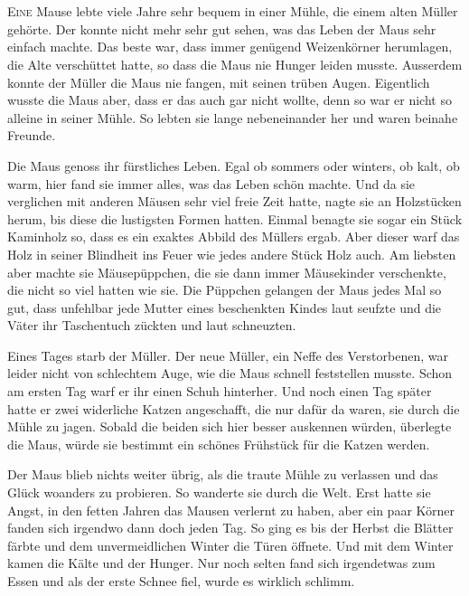 \chapter*{}
\lettrine[lines=3]{\color{red}E}{ine} Mause lebte viele Jahre sehr bequem in einer Mühle, die einem alten Müller gehörte. Der konnte nicht mehr sehr gut sehen, was das Leben der Maus sehr einfach machte. Das beste war, dass immer genügend Weizenkörner herumlagen, die Alte verschüttet hatte, so dass die Maus nie Hunger leiden musste. Ausserdem konnte der Müller die Maus nie fangen, mit seinen trüben Augen. Eigentlich wusste die Maus aber, dass er das auch gar nicht wollte, denn so war er nicht so alleine in seiner Mühle. So lebten sie lange nebeneinander her und waren beinahe Freunde. 

Die Maus genoss ihr fürstliches Leben. Egal ob sommers oder winters, ob kalt, ob warm, hier fand sie immer alles, was das Leben schön machte. Und da sie verglichen mit anderen Mäusen sehr viel freie Zeit hatte, nagte sie an Holzstücken herum, bis diese die lustigsten Formen hatten. Einmal benagte sie sogar ein Stück Kaminholz so, dass es ein exaktes Abbild des Müllers ergab. Aber dieser warf das Holz in seiner Blindheit ins Feuer wie jedes andere Stück Holz auch. Am liebsten aber machte sie Mäusepüppchen, die sie dann immer Mäusekinder verschenkte, die nicht so viel hatten wie sie. Die Püppchen gelangen der Maus jedes Mal so gut, dass unfehlbar jede Mutter eines beschenkten Kindes laut seufzte und die Väter ihr Taschentuch zückten und laut schneuzten. 

Eines Tages starb der Müller. Der neue Müller, ein Neffe des Verstorbenen, war leider nicht von schlechtem Auge, wie die Maus schnell feststellen musste. Schon am ersten Tag warf er ihr einen Schuh hinterher. Und noch einen Tag später hatte er zwei widerliche Katzen angeschafft, die nur dafür da waren, sie durch die Mühle zu jagen. Sobald die beiden sich hier besser auskennen würden, überlegte die Maus, würde sie bestimmt ein schönes Frühstück für die Katzen werden.

Der Maus blieb nichts weiter übrig, als die traute Mühle zu verlassen und das Glück woanders zu probieren. So wanderte sie durch die Welt. Erst hatte sie Angst, in den fetten Jahren das Mausen verlernt zu haben, aber ein paar Körner fanden sich irgendwo dann doch jeden Tag. So ging es bis der Herbst die Blätter färbte und dem unvermeidlichen Winter die Türen öffnete. Und mit dem Winter kamen die Kälte und der Hunger. Nur noch selten fand sich irgendetwas zum Essen und als der erste Schnee fiel, wurde es wirklich schlimm. 


